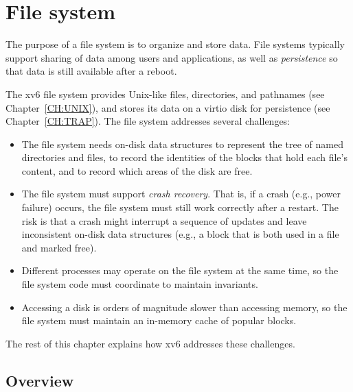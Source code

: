 \chapter{File system}
\label{CH:FS}
% 
% 
% 	
% 

The purpose of a file system is to organize and store data. File systems
typically support sharing of data among users and applications, as well as
\textit{persistence}
so that data is still available after a reboot.

The xv6 file system provides Unix-like files, directories, and pathnames
(see Chapter~\ref{CH:UNIX}), and stores its data on a virtio disk for
persistence (see Chapter~\ref{CH:TRAP}). The file system addresses
several challenges:
\begin{itemize}
  
\item The file system needs on-disk data structures to represent the tree
of named directories and files, to record the identities of the
blocks that hold each file's content, and to record which areas
of the disk are free.
\item The file system must support
\textit{crash recovery}.
That is, if a crash (e.g., power failure) occurs, the file system must
still work correctly after a restart. The risk is that a crash might
interrupt a sequence of updates and leave inconsistent on-disk data
structures (e.g., a block that is both used in a file and marked free).
\item Different processes may operate on the file system at the same time,
so the file system code must coordinate to maintain invariants.
\item Accessing a disk is orders of magnitude slower than accessing
memory, so the file system must maintain an in-memory cache of
popular blocks.

\end{itemize}

The rest of this chapter explains how xv6 addresses these challenges.
\section{Overview}

